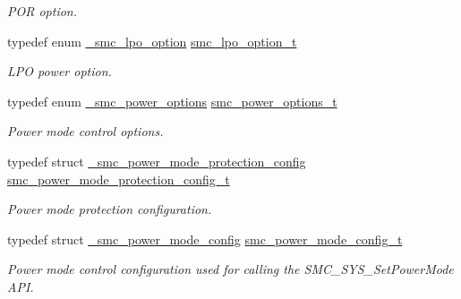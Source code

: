 \begin{DoxyCompactItemize}
\begin{DoxyCompactList}\small\item\em P\+OR option. \end{DoxyCompactList}\item 
typedef enum \hyperlink{group__smc__hal_ga7e05ac2b62300e11b27f08ba5f8f5162}{\+\_\+smc\+\_\+lpo\+\_\+option} \hyperlink{group__smc__hal_ga0a666ed608cb87b9ea1eb98c59a27e93}{smc\+\_\+lpo\+\_\+option\+\_\+t}\hypertarget{group__smc__hal_ga0a666ed608cb87b9ea1eb98c59a27e93}{}\label{group__smc__hal_ga0a666ed608cb87b9ea1eb98c59a27e93}

\begin{DoxyCompactList}\small\item\em L\+PO power option. \end{DoxyCompactList}\item 
typedef enum \hyperlink{group__smc__hal_ga286330695ac8bf94e6303a37f16a9a26}{\+\_\+smc\+\_\+power\+\_\+options} \hyperlink{group__smc__hal_ga094016faa448c41d949d980e564c30d2}{smc\+\_\+power\+\_\+options\+\_\+t}\hypertarget{group__smc__hal_ga094016faa448c41d949d980e564c30d2}{}\label{group__smc__hal_ga094016faa448c41d949d980e564c30d2}

\begin{DoxyCompactList}\small\item\em Power mode control options. \end{DoxyCompactList}\item 
typedef struct \hyperlink{struct__smc__power__mode__protection__config}{\+\_\+smc\+\_\+power\+\_\+mode\+\_\+protection\+\_\+config} \hyperlink{group__smc__hal_ga436ce8544adaf5118a524c8efda9aa9c}{smc\+\_\+power\+\_\+mode\+\_\+protection\+\_\+config\+\_\+t}\hypertarget{group__smc__hal_ga436ce8544adaf5118a524c8efda9aa9c}{}\label{group__smc__hal_ga436ce8544adaf5118a524c8efda9aa9c}

\begin{DoxyCompactList}\small\item\em Power mode protection configuration. \end{DoxyCompactList}\item 
typedef struct \hyperlink{struct__smc__power__mode__config}{\+\_\+smc\+\_\+power\+\_\+mode\+\_\+config} \hyperlink{group__smc__hal_gac4d791fd10f8c9951613d7f50d91b14f}{smc\+\_\+power\+\_\+mode\+\_\+config\+\_\+t}\hypertarget{group__smc__hal_gac4d791fd10f8c9951613d7f50d91b14f}{}\label{group__smc__hal_gac4d791fd10f8c9951613d7f50d91b14f}

\begin{DoxyCompactList}\small\item\em Power mode control configuration used for calling the S\+M\+C\+\_\+\+S\+Y\+S\+\_\+\+Set\+Power\+Mode A\+PI. \end{DoxyCompactList}\end{DoxyCompactItemize}
